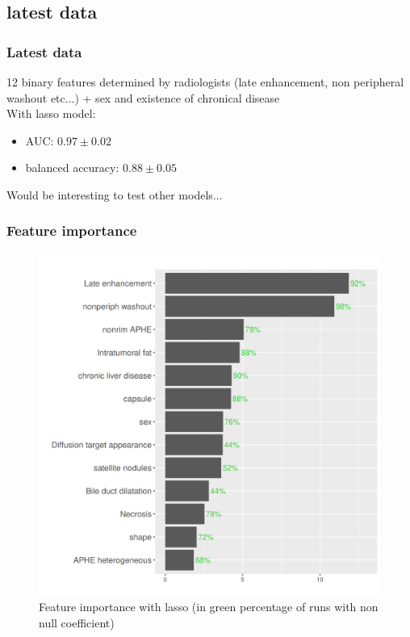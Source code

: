 \documentclass{beamer}
\begin{document}
\subsection{latest data}

\begin{frame}
    \frametitle{Latest data}
    12 binary features determined by radiologists (late enhancement, non peripheral washout etc...) + sex and existence of chronical disease\\[10 pt]
    With lasso model:
    \begin{itemize}
        \item AUC: $0.97 \pm 0.02$\\[10 pt]
        \item balanced accuracy: $0.88 \pm 0.05$
        \end{itemize}
    Would be interesting to test other models...
\end{frame}

\begin{frame}
    \frametitle{Feature importance}
    \begin{figure}
        \centering
        \includegraphics[scale = 0.38]{images/barplot_final.png}
        \caption{Feature importance with lasso (in green percentage of runs with non null coefficient)}
    \end{figure}
\end{frame}
\end{document}
